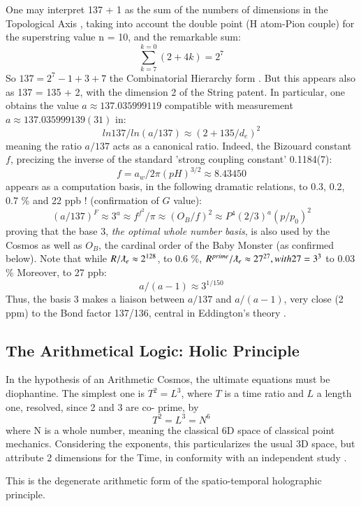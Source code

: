 \documentclass[twoside,draft]{article}
\begin{document}
\begin{sloppypar}
{One may interpret 137 + 1 as
the sum of the numbers of dimensions in the Topological Axis \cite{Sanchez1}, taking into account the double
point (H atom-Pion couple) for the superstring value n = 10, and the remarkable sum:
\begin{equation}
\sum_{k=7}^{k=0}(2 + 4 k ) = 2^{7}
\end{equation}
So $137 = 2^{7} - 1 + 3 + 7$ the Combinatorial Hierarchy form \cite{Sanchez1}. But this appears also as 137 = 135 + 2,
with the dimension 2 of the String patent. In particular, one obtains the value $a \approx 137.035999119$
compatible with measurement $a \approx 137.035999139(31)$ in:
\begin{equation}
ln137/ln(a/137) \approx (2+135/d_{e})^{2}
\end{equation}
meaning the ratio $a/137$ acts as a canonical ratio. Indeed, the Bizouard constant $f$, precizing \cite{Sanchez1} the inverse of the standard 'strong coupling constant' 0.1184(7): $$f = a_w/2\pi(pH)^{3/2} \approx 8.43450$$ appears as a computation basis, in the following dramatic relations, to 0.3, 0.2, 0.7 \% and 22 ppb ! (confirmation of $G$ value):
$$(a/137)^F \approx 3^a \approx f^{f^2}/\pi \approx (O_B/f)^2 \approx P^4 (2/3)^a (p/p_0)^2 $$
proving that the base 3, \textit{the optimal whole number basis}, is also used by the Cosmos as well as $O_B$, the cardinal order  of the Baby Monster (as confirmed below). 
Note that while $R/\lambdabar_e \approx 2^{128}$, to 0.6 \%, $R^{prime}/\lambdabar_e \approx 27^{27}, with 27 = 3^3$ to 0.03 \%  Moreover, to 27 ppb:
$$ a/(a-1) \approx 3^{1/150} $$
Thus, the basis 3 makes a liaison between $a/137$ and $a/(a-1)$, very close (2 ppm) to the Bond factor 137/136, central in Eddington's theory \cite{Eddy}.

\subsection{The Arithmetical Logic: Holic Principle}

In the hypothesis of an Arithmetic Cosmos, the ultimate equations must be diophantine. The
simplest one is $T^{2} = L^{3}$, where $T$ is a time ratio and $L$ a length one, resolved, since 2 and 3 are co-
prime, by $$T^{2} = L^{3} = N^{6}$$ where N is a whole number, meaning the classical 6D space of classical point mechanics. Considering the exponents, this particularizes the usual 3D space, but attribute 2 dimensions for the Time, in conformity with an independent study \cite{Bars}.

This is the degenerate arithmetic form of the spatio-temporal holographic principle.

}
\end{sloppypar}
\end{document}
